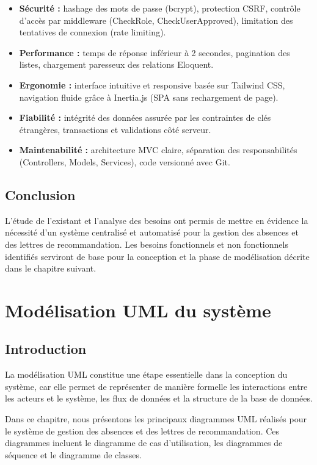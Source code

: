 \documentclass[12pt, a4paper, openright]{report}
\begin{document}
\begin{itemize}
    \item \textbf{Sécurité :} hashage des mots de passe (bcrypt), protection CSRF, contrôle d'accès par middleware (CheckRole, CheckUserApproved), limitation des tentatives de connexion (rate limiting).
    \item \textbf{Performance :} temps de réponse inférieur à 2 secondes, pagination des listes, chargement paresseux des relations Eloquent.
    \item \textbf{Ergonomie :} interface intuitive et responsive basée sur Tailwind CSS, navigation fluide grâce à Inertia.js (SPA sans rechargement de page).
    \item \textbf{Fiabilité :} intégrité des données assurée par les contraintes de clés étrangères, transactions et validations côté serveur.
    \item \textbf{Maintenabilité :} architecture MVC claire, séparation des responsabilités (Controllers, Models, Services), code versionné avec Git.
\end{itemize}

\section{Conclusion}

L'étude de l'existant et l'analyse des besoins ont permis de mettre en évidence la nécessité d'un système centralisé et automatisé pour la gestion des absences et des lettres de recommandation. Les besoins fonctionnels et non fonctionnels identifiés serviront de base pour la conception et la phase de modélisation décrite dans le chapitre suivant.

\cleardoublepage
\chapter{Modélisation UML du système}
\thispagestyle{fancy}

\section{Introduction}

La modélisation UML constitue une étape essentielle dans la conception du système, car elle permet de représenter de manière formelle les interactions entre les acteurs et le système, les flux de données et la structure de la base de données.

Dans ce chapitre, nous présentons les principaux diagrammes UML réalisés pour le système de gestion des absences et des lettres de recommandation. Ces diagrammes incluent le diagramme de cas d'utilisation, les diagrammes de séquence et le diagramme de classes.
\end{document}
